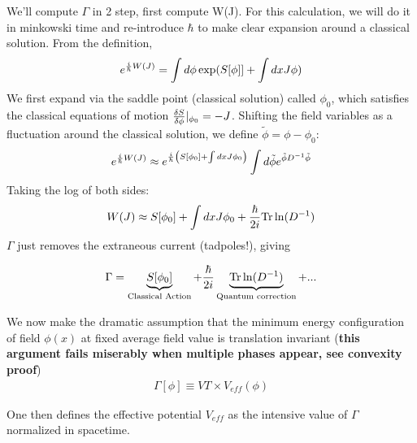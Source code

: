 \documentclass[11pt]{scrartcl}
\begin{document}
We'll compute $\Gamma$ in 2 step, first compute W(J).  For this calculation, we will do it in minkowski time and re-introduce $\hbar$ to make clear expansion around a classical solution.
From the definition, 
\begin{align}
e^{{i \over \hbar}W(J) } =  \int d \phi \exp( S[\phi]] + \int dx J \phi) 
\end{align}
We first expand via the saddle point (classical solution) called $\phi_0$, which satisfies the classical equations of motion ${\delta S \over \delta \phi}|_{\phi_0} = -J$.  Shifting the field variables as a fluctuation around the classical solution, we define $\tilde{\phi} = \phi- \phi_0$:
\begin{align}
e^{{i \over \hbar} W(J)} \approx e^{{i \over \hbar} \left(S[\phi_0] + \int dx J \phi_0 \right)}   \int d \tilde{\phi} e^{\tilde{\phi} D^{-1} \tilde{\phi} } \\
\end{align}
Taking the log of both sides:
\begin{align}
W(J)  \approx S[\phi_0] + \int dx J \phi_0 + {\hbar \over 2 i} \text{Tr} \ln(D^{-1})
\end{align}
$\Gamma$ just removes the extraneous current (tadpoles!), giving

\begin{align}
\Gamma = \underbrace{S[\phi_0]}_{\text{Classical Action}} + { \hbar \over 2 i} \underbrace{\text{Tr} \ln(D^{-1})}_{\text{Quantum correction}} + ...
\end{align}

We now make the dramatic assumption that the minimum energy configuration of field $\phi(x)$ at fixed average field value is translation invariant (\textbf{this argument fails miserably when multiple phases appear, see convexity proof})
\begin{align}
\Gamma[\phi] \equiv VT \times V_{eff}(\phi)
\end{align}

One then defines the effective potential $V_{eff}$ as the intensive value of $\Gamma$ normalized in spacetime.
\end{document}
